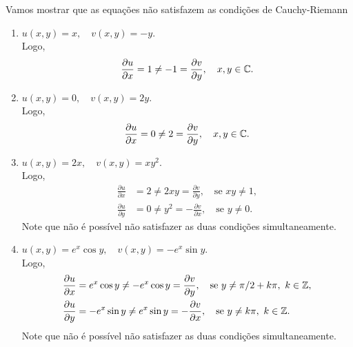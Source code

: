 \begin{questions}
\setcounter{question}{5}

\begin{solution}
Vamos mostrar que as equações não satisfazem as condições de Cauchy-Riemann
    \begin{enumerate}[label=(\alph*)]
      \item $u(x,y) = x, \quad v(x,y) = -y$.\\ Logo,
      \[\frac{\partial u}{\partial x} = 1 \neq -1  = \frac{\partial v}{\partial y}, \quad x,y\in{\mathbb C}.\]
      
      \item $u(x,y) = 0, \quad v(x,y) = 2y$.\\ Logo,
      \[\frac{\partial u}{\partial x} = 0 \neq 2  = \frac{\partial v}{\partial y}, \quad x,y\in{\mathbb C}.\]
      
      \item $u(x,y) = 2x, \quad v(x,y) = xy^2$.\\ Logo,
      \begin{align*}
          \frac{\partial u}{\partial x} &= 2 \neq 2xy  = \frac{\partial v}{\partial y}, \quad\text{se } xy \neq 1,\\
          \frac{\partial u}{\partial y} &= 0 \neq y^2  = -\frac{\partial v}{\partial x},  \quad\text{se } y \neq 0.
      \end{align*}
      Note que não é possível não satisfazer as duas condições simultaneamente.
      
      \item $u(x,y) = e^x\cos y, \quad v(x,y) = -e^x\sin y$.\\ Logo, \vspace{-5mm}
      \begin{align*}
          \frac{\partial u}{\partial x} &= e^x\cos y \neq -e^x\cos y  = \frac{\partial v}{\partial y}, \quad\text{se } y \neq \pi/2+k\pi,~ k\in{\mathbb Z},\\
          \frac{\partial u}{\partial y} &= -e^x\sin y \neq e^x\sin y  = -\frac{\partial v}{\partial x},  \quad\text{se } y \neq k\pi,~ k\in{\mathbb Z}.
      \end{align*}
      Note que não é possível não satisfazer as duas condições simultaneamente.
      

\end{enumerate}
\end{solution}
\end{questions}
